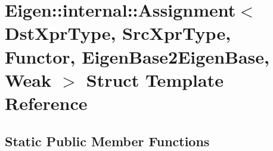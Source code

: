 \hypertarget{struct_eigen_1_1internal_1_1_assignment_3_01_dst_xpr_type_00_01_src_xpr_type_00_01_functor_00_018d07b9941c0091b62a0d03d702c7ac1b}{}\section{Eigen\+:\+:internal\+:\+:Assignment$<$ Dst\+Xpr\+Type, Src\+Xpr\+Type, Functor, Eigen\+Base2\+Eigen\+Base, Weak $>$ Struct Template Reference}
\label{struct_eigen_1_1internal_1_1_assignment_3_01_dst_xpr_type_00_01_src_xpr_type_00_01_functor_00_018d07b9941c0091b62a0d03d702c7ac1b}
\subsection*{Static Public Member Functions}
